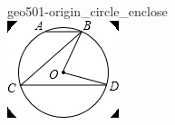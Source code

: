 \documentclass[12pt]{article}
\begin{document}
\begin{center}
\begin{minipage}{0.32\textwidth}
\end{minipage}
\hfill\begin{minipage}{0.32\textwidth}\centering
geo501-origin\_circle\_enclose\\
\includegraphics[width=0.95\linewidth]{out_rommath_origin/items/geo501-origin/assets/figure_circle.png}
\end{minipage}
\par
\end{center}
\bigskip
\end{document}
